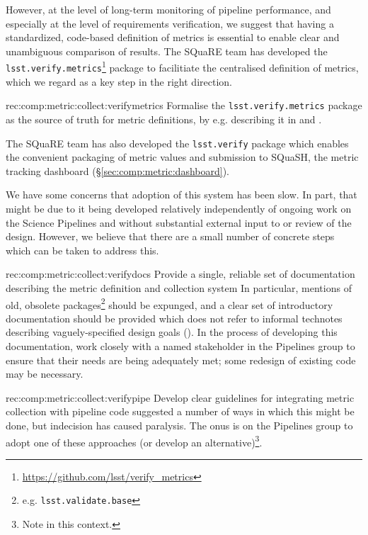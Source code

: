 However, at the level of long-term monitoring of pipeline performance, and especially at the level of requirements verification, we suggest that having a standardized, code-based definition of metrics is essential to enable clear and unambiguous comparison of results.
The SQuaRE team has developed the \texttt{lsst.verify.metrics}\footnote{\url{https://github.com/lsst/verify_metrics}} package to facilitiate the centralised definition of metrics, which we regard as a key step in the right direction.

\begin{recommendation}
    {rec:comp:metric:collect:verifymetrics}
    {Formalise the \texttt{lsst.verify.metrics} package as the source of truth for metric definitions, by e.g. describing it in  and .}
\end{recommendation}

The SQuaRE team has also developed the \texttt{lsst.verify} package which enables the convenient packaging of metric values and submission to SQuaSH, the metric tracking dashboard (\S\ref{sec:comp:metric:dashboard}).

We have some concerns that adoption of this system has been slow.
In part, that might be due to it being developed relatively independently of ongoing work on the Science Pipelines and without substantial external input to or review of the design.
However, we believe that there are a small number of concrete steps which can be taken to address this.

\begin{recommendation}
    {rec:comp:metric:collect:verifydocs}
    {Provide a single, reliable set of documentation describing the metric definition and collection system}
    In particular, mentions of old, obsolete packages\footnote{e.g. \texttt{lsst.validate.base}} should be expunged, and a clear set of introductory documentation should be provided which does not refer to informal technotes describing vaguely-specified design goals ().
    In the process of developing this documentation, work closely with a named stakeholder in the Pipelines group to ensure that their needs are being adequately met; some redesign of existing code may be necessary.
\end{recommendation}

\begin{recommendation}
    {rec:comp:metric:collect:verifypipe}
    {Develop clear guidelines for integrating metric collection with pipeline code}
     suggested a number of ways in which this might be done, but indecision has caused paralysis.
    The onus is on the Pipelines group to adopt one of these approaches (or develop an alternative)\footnote{Note  in this context.}.
\end{recommendation}


